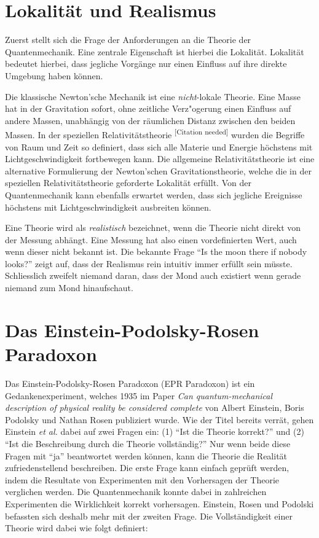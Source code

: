 \begin{refsection}
\section{Lokalit\"at und Realismus\label{section:bell:lokalitaet}}
Zuerst stellt sich die Frage der Anforderungen an die Theorie der
Quantenmechanik. Eine zentrale Eigenschaft ist hierbei die Lokalit\"at.
Lokalit\"at bedeutet hierbei, dass jegliche Vorg\"ange nur einen Einfluss
auf ihre direkte Umgebung haben k\"onnen.

Die klassische Newton'sche Mechanik ist eine \emph{nicht}-lokale 
Theorie. Eine Masse hat in der Gravitation sofort, ohne zeitliche 
Verz"ogerung einen Einfluss auf andere Massen, unabh\"angig von der
r\"aumlichen Distanz zwischen den beiden Massen. 
In der speziellen Relativit\"atstheorie 
\textsuperscript{[Citation needed]}
wurden die Begriffe von Raum und Zeit so definiert, dass sich alle
Materie und Energie h\"ochstens mit Lichtgeschwindigkeit fortbewegen
kann. 
Die allgemeine Relativit\"atstheorie ist eine alternative Formulierung
der Newton'schen Gravitationstheorie, welche die in der speziellen
Relativit\"atstheorie geforderte Lokalit\"at erf\"ullt.
Von der Quantenmechanik kann ebenfalls erwartet werden, dass sich
jegliche Ereignisse h\"ochstens mit Lichtgeschwindigkeit ausbreiten
k\"onnen.

Eine Theorie wird als \emph{realistisch} bezeichnet, wenn die Theorie
nicht direkt von der Messung abh\"angt. Eine Messung hat also einen
vordefinierten Wert, auch wenn dieser nicht bekannt ist.
Die bekannte Frage \enquote{Is the moon there if nobody looks?} zeigt auf,
dass der Realismus rein intuitiv immer erf\"ullt sein m\"usste. Schliesslich
zweifelt niemand daran, dass der Mond auch existiert wenn gerade niemand
zum Mond hinaufschaut.

\section{Das Einstein-Podolsky-Rosen Paradoxon\label{section:bell:epr}}
Das Einstein-Podolsky-Rosen Paradoxon (EPR Paradoxon) ist ein 
Gedankenexperiment, welches 1935 im Paper \cite{Bell:Einstein1935}
\emph{Can quantum-mechanical description of physical reality be considered complete}
von Albert Einstein, Boris Podolsky und Nathan Rosen publiziert wurde.
Wie der Titel bereits verr\"at, gehen Einstein \emph{et al.} dabei auf
zwei Fragen ein: 
(1) \enquote{Ist die Theorie korrekt?}
und 
(2) \enquote{Ist die Beschreibung durch die Theorie vollst\"andig?}
Nur wenn beide diese Fragen mit \enquote{ja} beantwortet werden k\"onnen, kann
die Theorie die Realit\"at zufriedenstellend beschreiben.
Die erste Frage kann einfach gepr\"uft werden, indem die Resultate von
Experimenten mit den Vorhersagen der Theorie verglichen werden. 
Die Quantenmechanik konnte dabei in zahlreichen Experimenten die Wirklichkeit
korrekt vorhersagen. 
Einstein, Rosen und Podolski befassten sich deshalb mehr mit der zweiten
Frage. 
Die Vollst\"andigkeit einer Theorie wird dabei wie folgt definiert:


\end{refsection}
